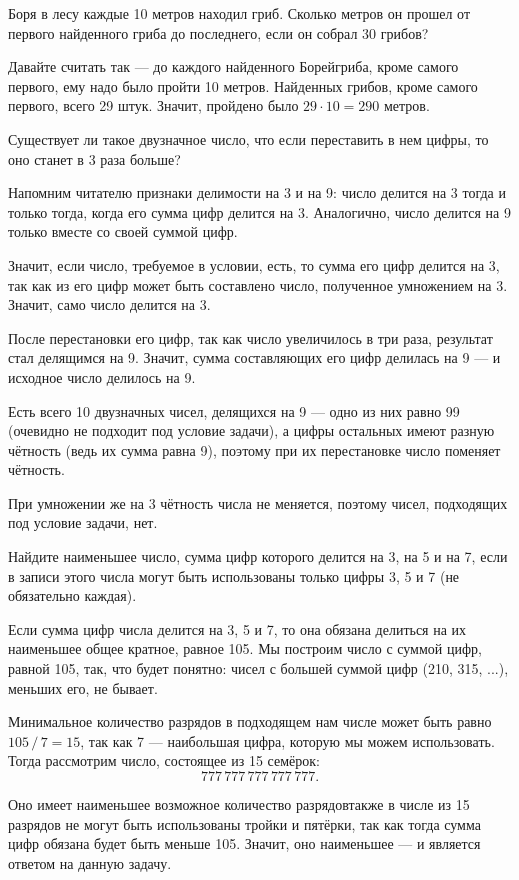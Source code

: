

\begin{itemize}

	\itA Боря в лесу каждые 10 метров находил гриб. Сколько метров он прошел от первого найденного гриба до последнего, если он собрал 30 грибов?
	
	\itr Давайте считать так — до каждого найденного Борей\linebreak гриба, кроме самого первого, ему надо было пройти 10 метров. Найденных грибов, кроме самого первого, всего 29 штук. Значит, пройдено было $29 \cdot 10 = 290$ метров.
	
	\itB Существует ли такое двузначное число, что если переставить в нем цифры, то оно станет в 3 раза больше?
	
	\itr Напомним читателю признаки делимости на 3 и на 9: число делится на 3 тогда и только тогда, когда его сумма цифр делится на 3. Аналогично, число делится на 9 только вместе со своей суммой цифр.
	
	Значит, если число, требуемое в условии, есть, то сумма его цифр делится на 3, так как из его цифр может быть составлено число, полученное умножением на 3. Значит, само число делится на 3.
	
	После перестановки его цифр, так как число увеличилось в три раза, результат стал делящимся на 9. Значит, сумма составляющих его цифр делилась на  9 — и исходное число делилось на 9.
	
	Есть всего 10 двузначных чисел, делящихся на 9 — одно из них равно 99 (очевидно не подходит под условие задачи), а цифры остальных имеют разную чётность (ведь их сумма равна 9), поэтому при их перестановке число поменяет чётность.
	
	При умножении же на 3 чётность числа не меняется, поэтому чисел, подходящих под условие задачи, нет.
	
	\itC Найдите наименьшее число, сумма цифр которого делится на 3, на 5 и на 7, если в записи этого числа могут быть использованы только цифры 3, 5 и 7 (не обязательно каждая).
	
	\itr Если сумма цифр числа делится на 3, 5 и 7, то она обязана делиться на их наименьшее общее кратное, равное 105. Мы построим число с суммой цифр, равной 105, так, что будет понятно: чисел с большей суммой цифр (210, 315, ...), меньших его, не бывает.
	
	Минимальное количество разрядов в подходящем нам числе может быть равно $105\,/\,7 = 15$, так как 7 — наибольшая цифра, которую мы можем использовать. Тогда рассмотрим число, состоящее из 15 семёрок:
	$$777\,777\,777\,777\,777.$$
	
	Оно имеет наименьшее возможное количество разрядов\scolon также в числе из 15 разрядов не могут быть использованы тройки и пятёрки, так как тогда сумма цифр обязана будет быть меньше 105. Значит, оно наименьшее — и является ответом на данную задачу.

\end{itemize}

